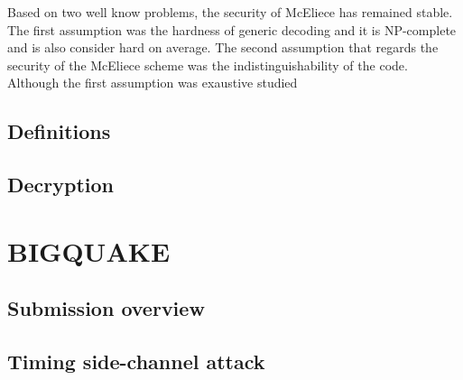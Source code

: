 Based on two well know problems, the security of McEliece has remained stable. The first assumption was the hardness of generic decoding and it is NP-complete and is also consider hard on average. The second assumption that regards the security of the McEliece scheme was the indistinguishability of the code. Although the first assumption was exaustive studied

\subsection{Definitions}
\subsection{Decryption}
\section{BIGQUAKE}
\subsection{Submission overview}
\subsection{Timing side-channel attack}